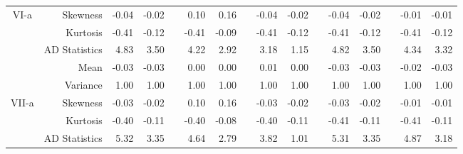 \documentclass[11pt,authoryear,review,3p,times]{elsarticle}
\begin{document}
\begin{table}[htbp]
{\begin{tabular}{crrrrrrrrrrrrrrr}
					VI-a    & Skewness & -0.04 & -0.02 &       & 0.10  & 0.16  &       & -0.04 & -0.02 &       & -0.04 & -0.02 &       & -0.01 & -0.01 \\
					& Kurtosis & -0.41 & -0.12 &       & -0.41 & -0.09 &       & -0.41 & -0.12 &       & -0.41 & -0.12 &       & -0.41 & -0.12 \\
					& AD Statistics & 4.83  & 3.50  &       & 4.22  & 2.92  &       & 3.18  & 1.15  &       & 4.82  & 3.50  &       & 4.34  & 3.32 \\
					\hline
					& Mean  & -0.03 & -0.03 &       & 0.00  & 0.00  &       & 0.01  & 0.00  &       & -0.03 & -0.03 &       & -0.02 & -0.03 \\
					& Variance    & 1.00  & 1.00  &       & 1.00  & 1.00  &       & 1.00  & 1.00  &       & 1.00  & 1.00  &       & 1.00  & 1.00 \\
					VII-a     & Skewness & -0.03 & -0.02 &       & 0.10  & 0.16  &       & -0.03 & -0.02 &       & -0.03 & -0.02 &       & -0.01 & -0.01 \\
					& Kurtosis & -0.40 & -0.11 &       & -0.40 & -0.08 &       & -0.40 & -0.11 &       & -0.41 & -0.11 &       & -0.41 & -0.11 \\
					& AD Statistics & 5.32  & 3.35  &       & 4.64  & 2.79  &       & 3.82  & 1.01  &       & 5.31  & 3.35  &       & 4.87  & 3.18 \\
					\hline
				\end{tabular}%
			}
			\label{tab:gama}%
		\end{table}%
\end{document}
